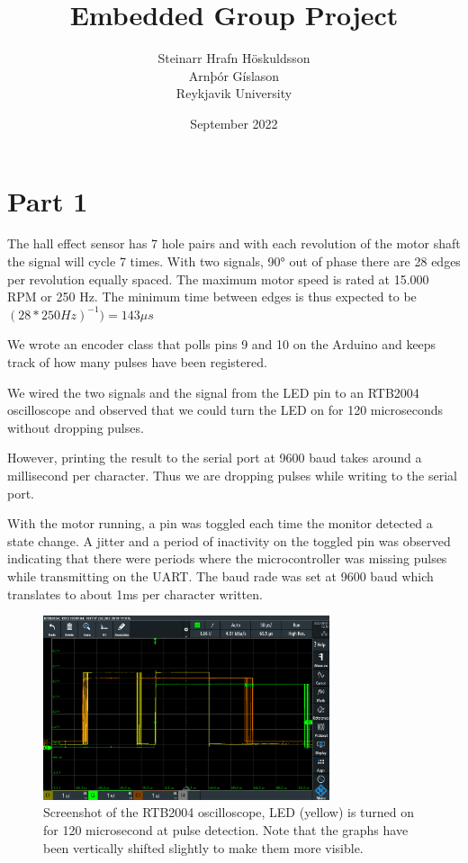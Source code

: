 \documentclass{article}
\title{Embedded Group Project}
\author{Steinarr Hrafn Höskuldsson\\
Arnþór Gíslason\\
Reykjavik University}
\date{September 2022}
\begin{document}
\maketitle

\section*{Part 1}
The hall effect sensor has 7 hole pairs and with each revolution of the motor shaft the signal will cycle 7 times. With two signals, 90° out of phase there are 28 edges per revolution equally spaced. The maximum motor speed is rated at 15.000 RPM or 250 Hz. The minimum time between edges is thus expected to be \((28*250Hz)^{-1}) = 143 \mu s\)

We wrote an encoder class that polls pins 9 and 10 on the Arduino and keeps track of how many pulses have been registered. 

We wired the two signals and the signal from the LED pin to an RTB2004 oscilloscope and observed that we could turn the LED on for 120 microseconds without dropping pulses. 


However, printing the result to the serial port at 9600 baud takes around a millisecond per character. Thus we are dropping pulses while writing to the serial port.


With the motor running, a pin was toggled each time the monitor detected a state change. A jitter and a period of inactivity on the toggled pin was observed indicating that there were periods where the microcontroller was missing pulses while transmitting on the UART. The baud rade was set at 9600 baud which translates to about 1ms per character written. 

\begin{figure}[h]
    \centering
    \includegraphics[width=0.75\textwidth]{Project1RotaryEncoder/oscilloscope_part1_120ms.PNG}
    \caption{Screenshot of the RTB2004 oscilloscope, LED (yellow) is turned on for 120 microsecond at pulse detection. Note that the graphs have been vertically shifted slightly to make them more visible.}
    \label{fig:osc120}
\end{figure}
\end{document}

